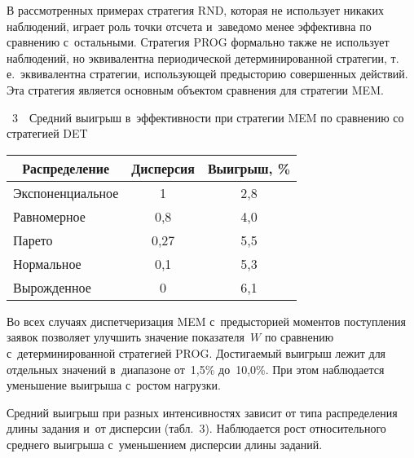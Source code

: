 \begin{multicols}{2}




    
    
    В рассмотренных примерах стратегия RND, которая не использует никаких 
наблюдений, играет роль точки отсчета и~заведомо менее эффективна по сравнению 
с~остальными. Стратегия PROG формально также не использует наблюдений, но 
эквивалентна периодической детерминированной стратегии, т.\,е.\ эквивалентна 
стратегии, использующей предысторию совершенных действий. Эта стратегия является 
основным объектом сравнения для стратегии MEM.

\pagebreak

\vspace*{-12pt}

\noindent
{\small
 \begin{center} 
\parbox{74mm}{{{\tablename~3}\ \ \small{Средний выигрыш в~эффективности при стратегии MEM по сравнению со стратегией DET}}
}

\vspace*{8pt}

 \begin{tabular}{|l|c|c|}
\hline
\multicolumn{1}{|c|}{Распределение}&
Дисперсия &
Выигрыш, \%\\
\hline
Экспоненциальное&1\hphantom{,9}&2,8\\
Равномерное&0,8&4,0\\
Парето&\hphantom{9}0,27&5,5\\
Нормальное&0,1&5,3\\
Вырожденное&0\hphantom{,9} &6,1\\
\hline
\end{tabular}
\end{center}
\vspace*{6pt}
}



\addtocounter{table}{1}



    
    Во всех случаях диспетчеризация MEM с~предыс\-то\-ри\-ей моментов поступления заявок 
позволяет улучшить значение показателя~$W$ по сравнению с~детерминированной 
стратегией PROG. Достигаемый выигрыш лежит для отдельных значений в~диапазоне 
от~1,5\% до~10,0\%. При этом наблюдается уменьшение выигрыша с~ростом нагрузки.
    
    Средний выигрыш при разных интенсивностях зависит от типа распределения длины 
задания и~от дисперсии (табл.~3). Наблюдается рост относительного среднего выигрыша 
с~уменьшением дисперсии длины заданий.
    



\end{multicols}
